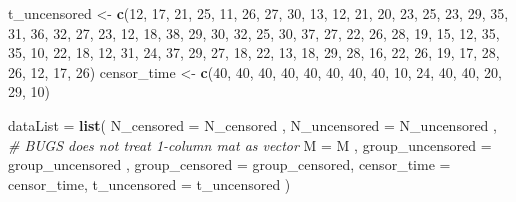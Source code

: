 \documentclass[]{article}
\newenvironment{Shaded}{\begin{snugshade}}{\end{snugshade}}
\newcommand{\KeywordTok}[1]{\textcolor[rgb]{0.13,0.29,0.53}{\textbf{#1}}}
\newcommand{\DataTypeTok}[1]{\textcolor[rgb]{0.13,0.29,0.53}{#1}}
\newcommand{\DecValTok}[1]{\textcolor[rgb]{0.00,0.00,0.81}{#1}}
\newcommand{\StringTok}[1]{\textcolor[rgb]{0.31,0.60,0.02}{#1}}
\newcommand{\CommentTok}[1]{\textcolor[rgb]{0.56,0.35,0.01}{\textit{#1}}}
\newcommand{\NormalTok}[1]{#1}
\begin{document}
\begin{Shaded}
\begin{Highlighting}[]
\NormalTok{t_uncensored <-}
\KeywordTok{c}\NormalTok{(}\DecValTok{12}\NormalTok{, }\DecValTok{17}\NormalTok{, }\DecValTok{21}\NormalTok{, }\DecValTok{25}\NormalTok{, }\DecValTok{11}\NormalTok{, }\DecValTok{26}\NormalTok{, }\DecValTok{27}\NormalTok{, }\DecValTok{30}\NormalTok{, }\DecValTok{13}\NormalTok{, }\DecValTok{12}\NormalTok{, }\DecValTok{21}\NormalTok{, }\DecValTok{20}\NormalTok{, }\DecValTok{23}\NormalTok{, }\DecValTok{25}\NormalTok{, }\DecValTok{23}\NormalTok{, }
\DecValTok{29}\NormalTok{, }\DecValTok{35}\NormalTok{, }\DecValTok{31}\NormalTok{, }\DecValTok{36}\NormalTok{, }\DecValTok{32}\NormalTok{, }\DecValTok{27}\NormalTok{, }\DecValTok{23}\NormalTok{, }\DecValTok{12}\NormalTok{, }\DecValTok{18}\NormalTok{, }\DecValTok{38}\NormalTok{, }\DecValTok{29}\NormalTok{, }\DecValTok{30}\NormalTok{, }\DecValTok{32}\NormalTok{, }\DecValTok{25}\NormalTok{, }\DecValTok{30}\NormalTok{, }\DecValTok{37}\NormalTok{, }
\DecValTok{27}\NormalTok{, }\DecValTok{22}\NormalTok{, }\DecValTok{26}\NormalTok{, }\DecValTok{28}\NormalTok{, }\DecValTok{19}\NormalTok{, }\DecValTok{15}\NormalTok{, }\DecValTok{12}\NormalTok{, }\DecValTok{35}\NormalTok{, }\DecValTok{35}\NormalTok{, }\DecValTok{10}\NormalTok{, }\DecValTok{22}\NormalTok{, }\DecValTok{18}\NormalTok{, }\DecValTok{12}\NormalTok{, }\DecValTok{31}\NormalTok{, }\DecValTok{24}\NormalTok{, }\DecValTok{37}\NormalTok{, }
\DecValTok{29}\NormalTok{, }\DecValTok{27}\NormalTok{, }\DecValTok{18}\NormalTok{, }\DecValTok{22}\NormalTok{, }\DecValTok{13}\NormalTok{, }\DecValTok{18}\NormalTok{, }\DecValTok{29}\NormalTok{, }\DecValTok{28}\NormalTok{, }\DecValTok{16}\NormalTok{, }\DecValTok{22}\NormalTok{, }\DecValTok{26}\NormalTok{, }\DecValTok{19}\NormalTok{, }\DecValTok{17}\NormalTok{, }\DecValTok{28}\NormalTok{, }\DecValTok{26}\NormalTok{, }\DecValTok{12}\NormalTok{, }
\DecValTok{17}\NormalTok{, }\DecValTok{26}\NormalTok{)}
\NormalTok{censor_time <-}
\KeywordTok{c}\NormalTok{(}\DecValTok{40}\NormalTok{, }\DecValTok{40}\NormalTok{, }\DecValTok{40}\NormalTok{, }\DecValTok{40}\NormalTok{, }\DecValTok{40}\NormalTok{, }\DecValTok{40}\NormalTok{, }\DecValTok{40}\NormalTok{, }\DecValTok{40}\NormalTok{, }\DecValTok{10}\NormalTok{, }\DecValTok{24}\NormalTok{, }\DecValTok{40}\NormalTok{, }\DecValTok{40}\NormalTok{, }\DecValTok{20}\NormalTok{, }\DecValTok{29}\NormalTok{, }\DecValTok{10}\NormalTok{)}

\NormalTok{dataList =}\StringTok{ }\KeywordTok{list}\NormalTok{(}
  \DataTypeTok{N_censored =}\NormalTok{ N_censored , }
  \DataTypeTok{N_uncensored =}\NormalTok{ N_uncensored , }\CommentTok{# BUGS does not treat 1-column mat as vector}
  \DataTypeTok{M =}\NormalTok{ M ,}
  \DataTypeTok{group_uncensored =}\NormalTok{ group_uncensored ,}
  \DataTypeTok{group_censored =}\NormalTok{ group_censored,}
  \DataTypeTok{censor_time =}\NormalTok{ censor_time,}
  \DataTypeTok{t_uncensored =}\NormalTok{ t_uncensored}
\NormalTok{)}
\end{Highlighting}
\end{Shaded}
\end{document}
